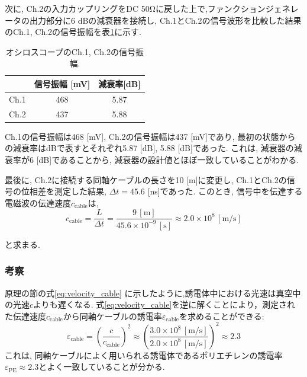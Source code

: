 \documentclass[uplatex,dvipdfmx,a4j,12pt]{jsarticle}
\begin{document}
次に, Ch.2の入力カップリングをDC 50\si{\ohm}に戻した上で,ファンクションジェネレータの出力部分に6 dBの減衰器を接続し, Ch.1とCh.2の信号波形を比較した結果のCh.1, Ch.2の信号振幅を表\ref{table:1-1-3}に示す.
\begin{table}[H]
    \centering
    \caption{オシロスコープのCh.1, Ch.2の信号振幅.}
    \label{table:1-1-3}
    \begin{tabular}{ccc}
        \hline
        & 信号振幅 [mV]& 減衰率[dB]\\
        \hline\hline
        Ch.1 & 468 & 5.87\\
        Ch.2 & 437 & 5.88\\
        \hline
    \end{tabular}
\end{table}
Ch.1の信号振幅は468 [mV], Ch.2の信号振幅は437 [mV]であり, 最初の状態からの減衰率はdBで表すとそれぞれ5.87 [dB], 5.88 [dB]であった.
これは, 減衰器の減衰率が6 [dB]であることから, 減衰器の設計値とほぼ一致していることがわかる.

最後に, Ch.2に接続する同軸ケーブルの長さを10 [m]に変更し, Ch.1とCh.2の信号の位相差を測定した結果, $\Delta t = 45.6$ [ns]であった.
このとき, 信号中を伝達する電磁波の伝達速度$c_\mathrm{cable}$は,
\begin{equation}
  c_\mathrm{cable} = \frac{L}{\Delta t} = \frac{9\,\mathrm{[m]}}{45.6 \times 10^{-9}\,\mathrm{[s]}} \approx 2.0 \times 10^8 \mathrm{\,[m/s]}
\end{equation}

と求まる.







\subsubsection{考察}


原理の節の式\eqref{eq:velocity_cable} に示したように,誘電体中における光速は真空中の光速$c$よりも遅くなる.
式\eqref{eq:velocity_cable}を逆に解くことにより，測定された伝達速度$c_\mathrm{cable}$から同軸ケーブルの誘電率$\varepsilon_\mathrm{cable}$を求めることができる:
\begin{equation}
  \varepsilon_\mathrm{cable} = \left(\frac{c}{c_\mathrm{cable}}\right)^2 \approx \left(\frac{3.0 \times 10^8\,\mathrm{[m/s]}}{2.0 \times 10^8\,\mathrm{[m/s]}}\right)^2 \approx 2.3
\end{equation}
これは, 同軸ケーブルによく用いられる誘電体であるポリエチレンの誘電率$\varepsilon_\mathrm{PE} \approx 2.3$とよく一致していることが分かる.
\end{document}
